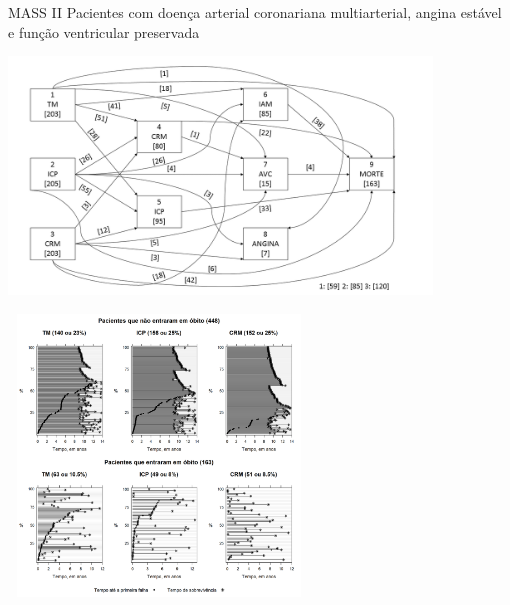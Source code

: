 \begin{frame}

\scriptsize

\begin{block}{MASS II}
 Pacientes com doença arterial coronariana multiarterial, angina estável e 
 função ventricular preservada
\end{block}

\pause \vspace{-.65cm}

\begin{center}
 \includegraphics*[width = 11.25cm]{mass.png}
\end{center}

\end{frame}

\begin{frame}

\vspace{-.2cm}\begin{center}
 \includegraphics*[height = 7.5cm, width = 8cm]{mass_times.png}
\end{center}

\end{frame}

